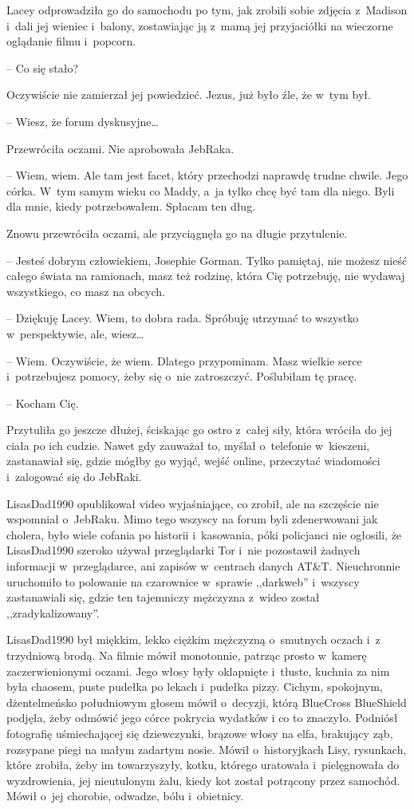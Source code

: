 \documentclass[oneside,polish,11pt,sfheadings]{mwbk}
\begin{document}
Lacey odprowadziła go do samochodu po tym, jak zrobili sobie zdjęcia z~Madison i~dali jej wieniec i~balony, zostawiając ją z~mamą jej
przyjaciółki na wieczorne oglądanie filmu i~popcorn.

-- Co się stało?

Oczywiście nie zamierzał jej powiedzieć. Jezus, już było źle, że w~tym
był.

-- Wiesz, że forum dyskusyjne\ldots 

Przewróciła oczami. Nie aprobowała JebRaka.

-- Wiem, wiem. Ale tam jest facet, który przechodzi naprawdę trudne
chwile. Jego córka. W~tym samym wieku co Maddy, a~ja tylko chcę być tam
dla niego. Byli dla mnie, kiedy potrzebowałem. Spłacam ten dług.

Znowu przewróciła oczami, ale przyciągnęła go na długie przytulenie. 

-- Jesteś dobrym człowiekiem, Josephie Gorman. Tylko pamiętaj, nie możesz
nieść całego świata na ramionach, masz też rodzinę, która Cię
potrzebuję, nie wydawaj wszystkiego, co masz na obcych.

-- Dziękuję Lacey. Wiem, to dobra rada. Spróbuję utrzymać to wszystko w~perspektywie, ale, wiesz\ldots 

-- Wiem. Oczywiście, że wiem. Dlatego przypominam. Masz wielkie serce i~potrzebujesz pomocy, żeby się o~nie zatroszczyć. Poślubiłam tę pracę.

-- Kocham Cię.

Przytuliła go jeszcze dłużej, ściskając go ostro z~całej siły, która
wróciła do jej ciała po ich cudzie. Nawet gdy zauważał to, myślał o~telefonie w~kieszeni, zastanawiał się, gdzie mógłby go wyjąć, wejść
online, przeczytać wiadomości i~zalogować się do JebRaki.

LisasDad1990 opublikował video wyjaśniające, co zrobił, ale na szczęście
nie wspomniał o~JebRaku. Mimo tego wszyscy na forum byli zdenerwowani
jak cholera, było wiele cofania po historii i~kasowania, póki policjanci
nie ogłosili, że LisasDad1990 szeroko używał przeglądarki Tor i~nie
pozostawił żadnych informacji w~przeglądarce, ani zapisów w~centrach
danych AT\&T. Nieuchronnie uruchomiło to polowanie na czarownice w~sprawie ,,darkweb'' i~wszyscy zastanawiali się, gdzie ten tajemniczy
mężczyzna z~wideo został ,,zradykalizowany''.

LisasDad1990 był miękkim, lekko ciężkim mężczyzną o~smutnych oczach i~z trzydniową brodą. Na filmie mówił monotonnie, patrząc prosto w~kamerę
zaczerwienionymi oczami. Jego włosy były oklapnięte i~tłuste, kuchnia za
nim była chaosem, puste pudełka po lekach i~pudełka pizzy. Cichym,
spokojnym, dżentelmeńsko południowym głosem mówił o~decyzji, którą
BlueCross BlueShield podjęła, żeby odmówić jego córce pokrycia wydatków
i co to znaczyło. Podniósł fotografię uśmiechającej się dziewczynki,
brązowe włosy na elfa, brakujący ząb, rozsypane piegi na małym zadartym
nosie. Mówił o~historyjkach Lisy, rysunkach, które zrobiła, żeby im
towarzyszyły, kotku, którego uratowała i~pielęgnowała do wyzdrowienia,
jej nieutulonym żalu, kiedy kot został potrącony przez samochód. Mówił o~jej chorobie, odwadze, bólu i~obietnicy.
\end{document}
